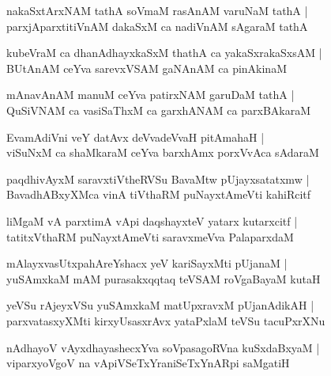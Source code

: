 \begin{shloka}
nakaSxtArxNAM tathA soVmaM rasAnAM varuNaM tathA |\\
parxjAparxtitiVnAM dakaSxM ca nadiVnAM sAgaraM tathA
\end{shloka}

\begin{shloka}
kubeVraM ca dhanAdhayxkaSxM thathA ca yakaSxrakaSxsAM |\\
BUtAnAM ceYva sarevxVSAM gaNAnAM ca pinAkinaM 
\end{shloka}

\begin{shloka}
mAnavAnAM manuM ceYva patirxNAM garuDaM tathA |\\
QuSiVNAM ca vasiSaThxM ca garxhANAM ca parxBAkaraM 
\end{shloka}

\begin{shloka}
EvamAdiVni veY datAvx deVvadeVvaH pitAmahaH |\\
viSuNxM ca shaMkaraM ceYva barxhAmx porxVvAca sAdaraM
\end{shloka}

\begin{shloka}
paqdhivAyxM saravxtiVtheRVSu BavaMtw pUjayxsatatxmw |\\
BavadhABxyXMca vinA tiVthaRM puNayxtAmeVti kahiRcitf
\end{shloka}

\begin{shloka}
liMgaM vA parxtimA vApi daqshayxteV yatarx kutarxcitf |\\
tatitxVthaRM puNayxtAmeVti saravxmeVva PalaparxdaM
\end{shloka}

\begin{shloka}
mAlayxvasUtxpahAreYshacx yeV kariSayxMti pUjanaM |\\
yuSAmxkaM mAM purasakxqqtaq teVSAM roVgaBayaM kutaH 
\end{shloka}

\begin{shloka}
yeVSu rAjeyxVSu yuSAmxkaM matUpxravxM pUjanAdikAH |\\
parxvatasxyXMti kirxyUsasxrAvx yataPxlaM teVSu tacuPxrXNu
\end{shloka}

\begin{shloka}
nAdhayoV vAyxdhayashecxYva soVpasagoRVna kuSxdaBxyaM |\\
viparxyoVgoV na vApiVSeTxYraniSeTxYnARpi saMgatiH 
\end{shloka}

